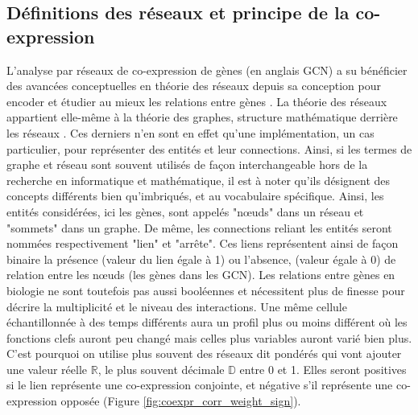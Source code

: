 \subsection{Définitions des réseaux et principe de la co-expression}

L'analyse par réseaux de co-expression de gènes (en anglais \acrfull{GCN}) a su bénéficier des avancées conceptuelles en théorie des réseaux depuis sa conception pour encoder et étudier au mieux les relations entre gènes \cite{Barabasi2011Jan}. La théorie des réseaux appartient elle-même à la théorie des graphes, structure mathématique derrière les réseaux \cite{Barnes1983Jun}. Ces derniers n'en sont en effet qu'une implémentation, un cas particulier, pour représenter des entités et leur connections. Ainsi, si les termes de graphe et réseau sont souvent utilisés de façon interchangeable hors de la recherche en informatique et mathématique, il est à noter qu'ils désignent des concepts différents bien qu'imbriqués, et au vocabulaire spécifique. Ainsi, les entités considérées, ici les gènes, sont appelés "nœuds" dans un réseau et "sommets" dans un graphe. De même, les connections reliant les entités seront nommées respectivement "lien" et "arrête". Ces liens représentent ainsi de façon binaire la présence (valeur du lien égale à 1) ou l'absence, (valeur égale à 0) de relation entre les nœuds (les gènes dans les \acrshort{GCN}). Les relations entre gènes en biologie ne sont toutefois pas aussi booléennes et nécessitent plus de finesse pour décrire la multiplicité et le niveau des interactions. Une même cellule échantillonnée à des temps différents aura un profil plus ou moins différent où les fonctions clefs auront peu changé mais celles plus variables auront varié bien plus. C'est pourquoi on utilise plus souvent des réseaux dit pondérés qui vont ajouter une valeur réelle $\mathbb{R}$, le plus souvent décimale $\mathbb{D}$ entre 0 et 1. Elles seront positives si le lien représente une co-expression conjointe, et négative s’il représente une co-expression opposée (Figure \ref{fig:coexpr_corr_weight_sign}).


